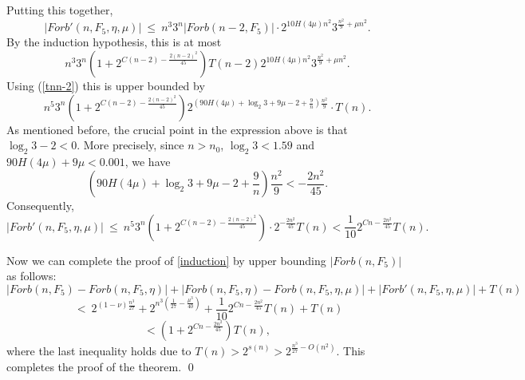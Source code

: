 \documentclass[11pt]{article}
\begin{document}
Putting this together,
\begin{equation}
|Forb'(n,F_5,\eta,\mu)|\ \le\ n^3 3^n |Forb(n-2,F_5)|\cdot  2^{10
H(4\mu)n^2} 3^{\frac{n^2}{9}+\mu n^2}.\end{equation}
 By the induction hypothesis, this is at most
$$  n^3 3^n (1+2^{C(n-2)-\frac{2(n-2)^2}{45}})T(n-2)
2^{10H(4\mu)n^2}3^{\frac{n^2}{9}+\mu n^2}.$$
Using (\ref{tnn-2})  this is upper bounded by
  $$ n^5 3^n\left(1+2^{C(n-2)-\frac{2(n-2)^2}{45}}\right)
2^{(90H(4\mu)+ \log_2 3+9\mu-2+\frac9n)\frac{n^2}{9}}\cdot T(n).$$
As mentioned before, the crucial point in the expression above is that $\log_2 3-2<0$.
More precisely, since  $n>n_0$,  $\log_2 3<1.59$ and
$90H(4\mu)+9\mu<0.001$, we have
$$\left(90H(4\mu)+ \log_2 3+9\mu-2+\frac9n\right)\frac{n^2}{9}<-\frac{2n^2}{45}.$$
Consequently,
$$ |Forb'(n,F_5,\eta,\mu)|\ \le\ n^5 3^n\left(1+2^{C(n-2)-\frac{2(n-2)^2}{45}}\right)  \cdot  2^{-\frac{2n^2}{45}}T(n)< \frac{1}{10} 2^{Cn-\frac{2n^2}{45}}T(n).  $$


Now we can complete the proof of \eqref{induction} by upper bounding $|Forb(n,F_5)|$ as follows:
$$ |Forb(n,F_5)-Forb(n, F_5, \eta)| + |Forb(n,F_5,\eta)-Forb(n,F_5,\eta,\mu)| + |Forb'(n,F_5,\eta,\mu)|+T(n)$$
$$ \ < \  2^{(1-\nu)\frac{n^3}{27}} + 2^{n^3(\frac{1}{27}-\frac{\mu^3}{40})} +  \frac{1}{10}
2^{Cn-\frac{2n^2}{45}}T(n) + T(n)$$ $$ <
 (1+2^{Cn-\frac{2n^2}{45}})T(n),$$
where the last inequality holds due to $T(n)>2^{s(n)}>2^{\frac{n^3}{27}-O(n^2)}$.
This completes the proof of the theorem. \qed
\end{document}
